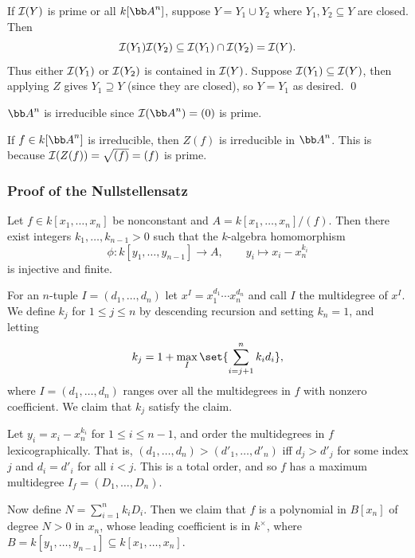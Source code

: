     If ${{\cal I}}(Y)$ is prime or all $k[\bA^n]$, suppose $Y=Y_1\cup Y_2$ where $Y_1,Y_2\subseteq Y$ are closed.
    Then
    $$ {{\cal I}}(Y_1){{\cal I}}(Y_2) \subseteq {{\cal I}}(Y_1)\cap{{\cal I}}(Y_2) = {{\cal I}}(Y) . $$
    Thus either ${{\cal I}}(Y_1)$ or ${{\cal I}}(Y_2)$ is contained in ${{\cal I}}(Y)$.
    Suppose ${{\cal I}}(Y_1)\subseteq{{\cal I}}(Y)$, then applying $Z$ gives $Y_1\supseteq Y$ (since they are closed), so $Y=Y_1$ as desired.
    \qed

\eproof

\bexam

    $\bA^n$ is irreducible since $\I(\bA^n)=(0)$ is prime.

    If $f\in k[\bA^n]$ is irreducible, then $Z(f)$ is irreducible in $\bA^n$.
    This is because ${{\cal I}}(Z(f))=\sqrt{(f)}=(f)$ is prime.

\eexam

\subsubsection*{Proof of the Nullstellensatz}

\blemm

    Let $f\in k[x_1,\dots,x_n]$ be nonconstant and $A=k[x_1,\dots,x_n]/(f)$.
    Then there exist integers $k_1,\dots,k_{n-1}>0$ such that the $k$-algebra homomorphism
    $$ \phi\colon k[y_1,\dots,y_{n-1}] \to A,\qquad y_i\mapsto x_i-x_n^{k_i} $$
    is injective and finite.

\elemm

\bproof

    For an $n$-tuple $I=(d_1,\dots,d_n)$ let $x^I=x_1^{d_1}\cdots x_n^{d_n}$ and call $I$ the {\emphcolor multidegree} of $x^I$.
    We define $k_j$ for $1\leq j\leq n$ by descending recursion and setting $k_n=1$, and letting
    $$ k_j = 1 + \max_I\set{\sum_{i=j+1}^nk_id_i} , $$
    where $I=(d_1,\dots,d_n)$ ranges over all the multidegrees in $f$ with nonzero coefficient.
    We claim that $k_j$ satisfy the claim.

    Let $y_i=x_i-x_n^{k_i}$ for $1\leq i\leq n-1$, and order the multidegrees in $f$ lexicographically.
    That is, $(d_1,\dots,d_n)>(d'_1,\dots,d'_n)$ iff $d_j>d'_j$ for some index $j$ and $d_i=d'_i$ for all $i<j$.
    This is a total order, and so $f$ has a maximum multidegree $I_f=(D_1,\dots,D_n)$.

    Now define $N=\sum_{i=1}^nk_iD_i$.
    Then we claim that $f$ is a polynomial in $B[x_n]$ of degree $N>0$ in $x_n$, whose leading coefficient is in $k^\times$, where
    $B=k[y_1,\dots,y_{n-1}]\subseteq k[x_1,\dots,x_n]$.

